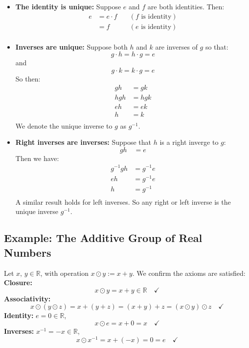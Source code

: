 \documentclass[12pt]{article}
\begin{document}
\begin{itemize}
\item {\bf The identity is unique:} Suppose $e$ and $f$ are both identities. Then:
\begin{align*}
  e &= e \cdot f \quad & (f \text{ is identity}) \\
    &= f & (e \text{ is identity}) \\
\end{align*}
\item {\bf Inverses are unique: } Suppose both $h$ and $k$ are inverses of $g$ so that:
$$ g \cdot h = h \cdot g = e$$
and  
$$ g \cdot k = k \cdot g = e$$
So then:
\begin{align*}
  gh &= gk \\
  hgh &= hgk \\
  eh &= ek \\
  h &= k \\
\end{align*}
We denote the unique inverse to $g$ as $g^{-1}$.
\item {\bf Right inverses are inverses: } Suppose that $h$ is a right inverge to $g$:
$$ gh \quad = e$$
  Then we have:
\begin{align*}
g^{-1} g h &= g^{-1} e \\
e h &= g^{-1} e \\
  h &= g^{-1} \\
\end{align*}  
A similar result holds for left inverses.  So any right or left inverse is the unique inverse $g^{-1}$. 
\end{itemize}

\subsection*{Example:  The Additive Group of Real Numbers}

Let $x,\, y \in \mathbb{R}$, with operation $x \odot y := x + y$.  We
confirm the axioms are satisfied:\\[10pt]
\textbf{Closure:}
\begin{equation*}
  x \odot y = x + y \in \mathbb{R} \quad \checkmark
\end{equation*}
\textbf{Associativity:}
\begin{equation*}
  x \odot (y \odot z) = x + (y + z)
  = (x + y) + z = (x \odot y) \odot z \quad \checkmark
\end{equation*}
\textbf{Identity:} $e = 0 \in \mathbb{R}$,
\begin{equation*}
  x \odot e = x + 0 = x \quad \checkmark
\end{equation*}
\textbf{Inverses:} $x^{-1} = -x \in \mathbb{R}$,
\begin{equation*}
  x \odot x^{-1} = x + (-x) = 0 = e \quad \checkmark
\end{equation*}
\end{document}
